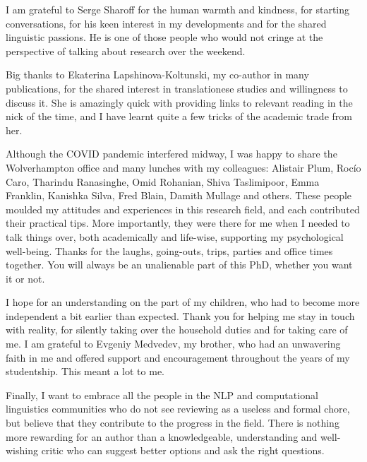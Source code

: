 I am grateful to Serge Sharoff for the human warmth and kindness, for starting conversations, for his keen interest in my developments and for the shared linguistic passions. He is one of those people who would not cringe at the perspective of talking about research over the weekend.

Big thanks to Ekaterina Lapshinova-Koltunski, my co-author in many publications, for the shared interest in translationese studies and willingness to discuss it. She is amazingly quick with providing links to relevant reading in the nick of the time, and I have learnt quite a few tricks of the academic trade from her. 

Although the COVID pandemic interfered midway, I was happy to share the Wolverhampton office and many lunches with my colleagues: Alistair Plum, Rocío Caro, Tharindu Ranasinghe, Omid Rohanian, Shiva Taslimipoor, Emma Franklin, Kanishka Silva, Fred Blain, Damith Mullage and others. These people moulded my attitudes and experiences in this research field, and each contributed their practical tips. More importantly, they were there for me when I needed to talk things over, both academically and life-wise, supporting my psychological well-being. Thanks for the laughs, going-outs, trips, parties and office times together. You will always be an unalienable part of this PhD, whether you want it or not. 

I hope for an understanding on the part of my children, who had to become more independent a bit earlier than expected. 
Thank you for helping me stay in touch with reality, for silently taking over the household duties and for taking care of me. I am grateful to Evgeniy Medvedev, my brother, who had an unwavering faith in me and offered support and encouragement throughout the years of my studentship. This meant a lot to me. 

Finally, I want to embrace all the people in the NLP and computational linguistics communities who do not see reviewing as a useless and formal chore, but believe that they contribute to the progress in the field. There is nothing more rewarding for an author than a knowledgeable, understanding and well-wishing critic who can suggest better options and ask the right questions. 
